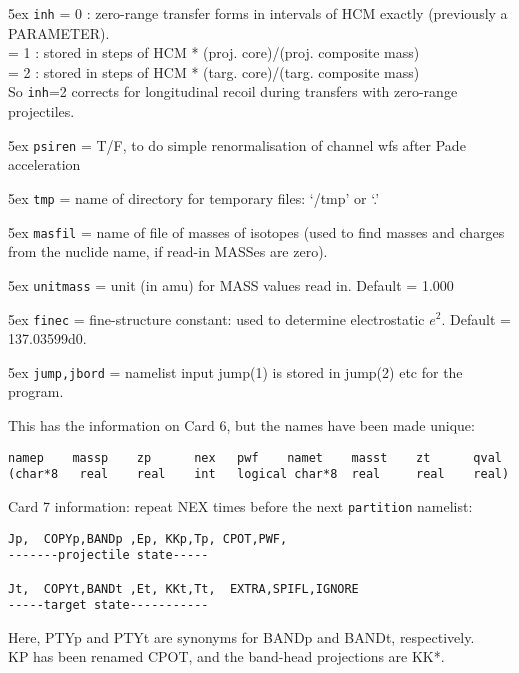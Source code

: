 \documentclass[11pt]{article}
\begin{document}
\hangindent 5ex
{\tt inh} = 0 : zero-range transfer forms in intervals of HCM exactly
        (previously a PARAMETER).\\
    = 1 : stored in steps of HCM * (proj. core)/(proj. composite mass)\\
    = 2 : stored in steps of HCM * (targ. core)/(targ. composite mass)\\
    So {\tt inh}=2 corrects for longitudinal recoil during transfers
with zero-range projectiles.

\hangindent 5ex
{\tt psiren} = T/F, to do simple renormalisation of channel wfs after Pade acceleration

\hangindent 5ex
{\tt tmp} = name of directory for temporary files: `/tmp' or `.'

\hangindent 5ex
{\tt masfil} = name of file of masses of isotopes (used to find masses and charges
from the nuclide name, if read-in MASSes are zero).

\hangindent 5ex
{\tt unitmass} = unit (in amu) for MASS values read in.
Default = 1.000

\hangindent 5ex
{\tt finec} = fine-structure constant: used to determine electrostatic $e^2$.
Default = 137.03599d0.

\hangindent 5ex
{\tt jump,jbord} = namelist input jump(1) is stored in jump(2) etc for the program.



This has the information on Card 6, but the names have been made unique:
\begin{verbatim}
namep    massp    zp      nex   pwf    namet    masst    zt      qval
(char*8   real    real    int   logical char*8  real     real    real)
\end{verbatim}

Card 7 information: repeat NEX times before the next {\tt partition} namelist:
\begin{verbatim}
Jp,  COPYp,BANDp ,Ep, KKp,Tp, CPOT,PWF,
-------projectile state-----

Jt,  COPYt,BANDt ,Et, KKt,Tt,  EXTRA,SPIFL,IGNORE
-----target state-----------
\end{verbatim}
Here, PTYp and PTYt are synonyms for BANDp and BANDt, respectively.\\
KP has been renamed CPOT, and the band-head projections are KK*.
\end{document}
